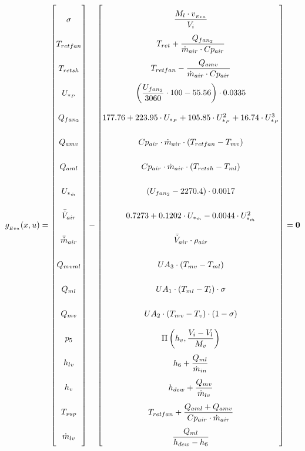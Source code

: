 \begin{equation} \label{eq:Gevaporator}\renewcommand{\arraystretch}{2.5}
	g_{_{Eva}}(x,u) =  \begin{bmatrix}
		\sigma		\\
		T_{retfan}	\\
		T_{retsh}	\\
		U_{*_P}	\\
		Q_{fan_2}		\\
		Q_{amv}		\\
		Q_{aml}		\\
		U_{*_{\dot{m}}}	\\
		\bar{\dot{V}}_{air}		\\
		\bar{\dot{m}}_{air}		\\
		Q_{mvml}	\\
		Q_{ml}		\\
		Q_{mv}		\\
		p_{5}		\\
		h_{lv}			\\
		h_v 		\\
		T_{sup}		\\
		\dot{m}_{lv}\\
	\end{bmatrix}
	-
	\begin{bmatrix}
		\dfrac{M_l \cdot v_{_{Eva}}}{V_i}							\\
		T_{ret} + \dfrac{Q_{fan_2}}{\dot{m}_{air} \cdot Cp_{air}}			\\
		T_{retfan} - \dfrac{Q_{amv}}{\dot{m}_{air} \cdot Cp_{air}}		\\
		\left( \dfrac{U_{fan_2}}{3060}\cdot 100 - 55.56 \right) \cdot 0.0335 \\
		177.76 + 223.95 \cdot U_{*_P} + 105.85 \cdot U_{*_P}^2 + 16.74 \cdot U_{*_P}^3 \\
		Cp_{air} \cdot \dot{m}_{air} \cdot (T_{retfan} - T_{mv}) 	 \\
		Cp_{air} \cdot \dot{m}_{air} \cdot (T_{retsh} - T_{ml}) \\
		(U_{fan_2} - 2270.4)\cdot 0.0017 \\
		0.7273 + 0.1202 \cdot 	U_{*_{\dot{m}}}  -0.0044 \cdot	U_{*_{\dot{m}}}^2\\
		\bar{\dot{V}}_{air} \cdot \rho_{air}	\\
		U A_3 \cdot (T_{mv} - T_{ml})	\\
		U A_1 \cdot (T_{ml} - T_l) \cdot \sigma	\\
		U A_2 \cdot (T_{mv} - T_v) \cdot (1- \sigma)	\\
		\Pi \left( h_v, \dfrac{V_i-V_l}{M_v} \right)		\\
		h_{6} + \dfrac{Q_{ml}}{\dot{m}_{in}}			\\
		h_{dew} + \dfrac{Q_{mv}}{\dot{m}_{lv}}   		\\
		T_{retfan} +  \dfrac{Q_{aml} + Q_{amv}}{Cp_{air} \cdot \dot{m}_{air}} \\
		\dfrac{Q_{ml}}{h_{dew} - h_{6}}		\\
	\end{bmatrix}
	=\textbf{0}
\end{equation}



